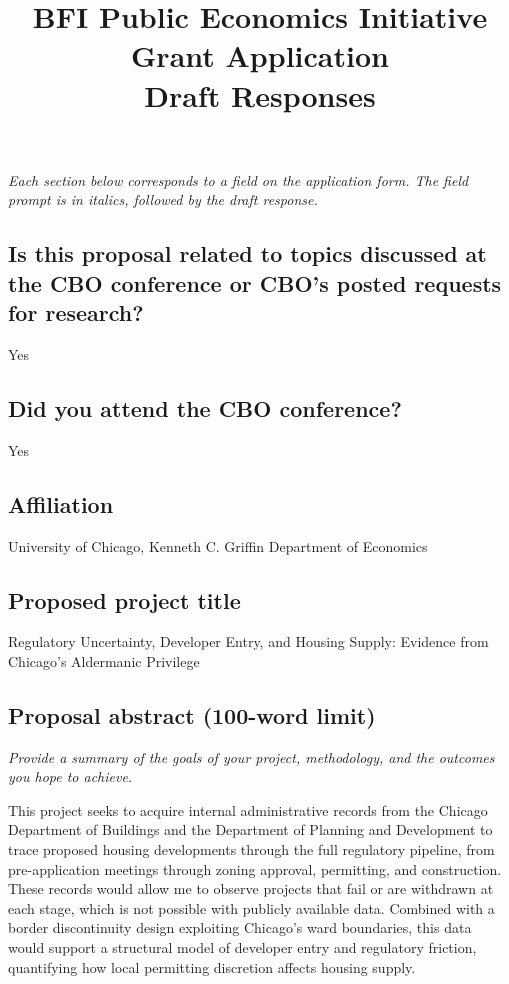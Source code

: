 \documentclass[12pt]{article}
\title{BFI Public Economics Initiative Grant Application \\ Draft Responses}
\author{}
\date{}
\begin{document}
\maketitle

\noindent\textit{Each section below corresponds to a field on the application form. The field prompt is in italics, followed by the draft response.}

\bigskip

\subsection*{Is this proposal related to topics discussed at the CBO conference or CBO's posted requests for research?}

Yes

\subsection*{Did you attend the CBO conference?}

Yes

\subsection*{Affiliation}

University of Chicago, Kenneth C. Griffin Department of Economics

\subsection*{Proposed project title}

Regulatory Uncertainty, Developer Entry, and Housing Supply: Evidence from Chicago's Aldermanic Privilege

\subsection*{Proposal abstract (100-word limit)}

\textit{Provide a summary of the goals of your project, methodology, and the outcomes you hope to achieve.}

\medskip

This project seeks to acquire internal administrative records from the Chicago Department of Buildings and the Department of Planning and Development to trace proposed housing developments through the full regulatory pipeline, from pre-application meetings through zoning approval, permitting, and construction. These records would allow me to observe projects that fail or are withdrawn at each stage, which is not possible with publicly available data. Combined with a border discontinuity design exploiting Chicago's ward boundaries, this data would support a structural model of developer entry and regulatory friction, quantifying how local permitting discretion affects housing supply.
\end{document}
